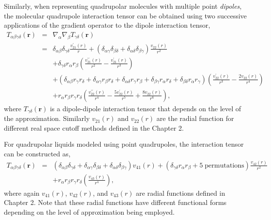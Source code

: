 Similarly, when representing quadrupolar molecules with multiple point
\textit{dipoles}, the molecular quadrupole interaction tensor can be
obtained using two successive applications of the gradient operator to
the dipole interaction tensor,
\begin{eqnarray}
T_{\alpha\beta\gamma\delta}(\mathbf{r}) &=& \nabla_\alpha \nabla_\beta
                                            T_{\gamma\delta}(\mathbf{r}) \\ 
& = & \delta_{\alpha\beta}\delta_{\gamma\delta} \frac{v^\prime_{21}(r)}{r} +
      \left(\delta_{\alpha\gamma}\delta_{\beta\delta}+
      \delta_{\alpha\delta}\delta_{\beta\gamma}\right)\frac{v_{22}(r)}{r^2}
      \nonumber\\ 
 & &+ \delta_{\gamma\delta} r_\alpha r_\beta
     \left(\frac{v^{\prime \prime}_{21}(r)}{r^2}-\frac{v^\prime_{21}(r)}{r^3} \right)\nonumber \\
 & &+\left(\delta_{\alpha\beta} r_\gamma r_\delta +
     \delta_{\alpha\gamma} r_\beta r_\delta  +\delta_{\alpha\delta}
     r_\gamma r_\beta + \delta_{\beta\gamma} r_\alpha r_\delta
     +\delta_{\beta\delta} r_\alpha r_\gamma  \right)
     \left(\frac{v^\prime_{22}(r)}{r^3}-\frac{2v_{22}(r)}{r^4}\right)
     \nonumber \\
 & &+ r_\alpha r_\beta r_\gamma r_\delta
     \left(\frac{v^{\prime
     \prime}_{22}(r)}{r^4}-\frac{5v^\prime_{22}(r)}{r^5}+\frac{8v_{22}(r)}{r^6}\right),
\label{quadDip}
\end{eqnarray}
where $T_{\gamma\delta}(\mathbf{r})$ is a dipole-dipole interaction
tensor that depends on the level of the
approximation.\cite{PaperI,PaperII} Similarly $v_{21}(r)$ and
$v_{22}(r)$ are the radial function for different real space cutoff
methods defined in the Chapter 2.\cite{PaperI}

For quadrupolar liquids modeled using point quadrupoles, the
interaction tensor can be constructed as,
\begin{eqnarray}
T_{\alpha\beta\gamma\delta}(\mathbf{r}) &=&
                                              \left(\delta_{\alpha\beta}\delta_{\gamma\delta}
                                              +
                                              \delta_{\alpha\gamma}\delta_{\beta\delta}+
                                              \delta_{\alpha\delta}\delta_{\beta\gamma}\right)v_{41}(r)
                                              + (\delta_{\gamma\delta} r_\alpha r_\beta +  \mathrm{ 5\; permutations}) \frac{v_{42}(r)}{r^2} \nonumber \\  
& & + r_\alpha r_\beta r_\gamma r_\delta  \left(\frac{v_{43}(r)}{r^4}\right), 
\label{quadRadial}
\end{eqnarray}
where again $v_{41}(r)$, $v_{42}(r)$, and $v_{43}(r)$ are radial
functions defined in Chapter 2. \cite{PaperI} Note that
these radial functions have different functional forms depending on
the level of approximation being employed.

